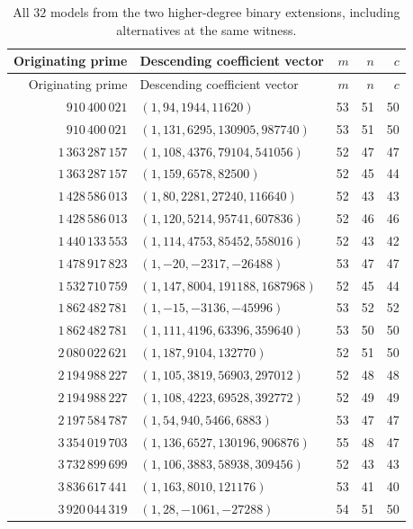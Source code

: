 \documentclass[11pt]{article}
\theoremstyle{definition}\newtheorem{definition}[theorem]{Definition}
\begin{document}
\begin{center}\small\setlength{\tabcolsep}{4pt}
\begin{longtable}{rP{85mm}rrr}
\caption{All $32$ models from the two higher-degree binary extensions, including alternatives at the same witness.}\label{tab:additional}\\
\toprule
Originating prime & Descending coefficient vector & $m$ & $n$ & $c$ \\
\midrule\endfirsthead
\toprule
Originating prime & Descending coefficient vector & $m$ & $n$ & $c$ \\
\midrule\endhead
$910\,400\,021$ & $(1,94,1944,11620)$ & 53 & 51 & 50 \\
$910\,400\,021$ & $(1,131,6295,130905,987740)$ & 53 & 51 & 50 \\
$1\,363\,287\,157$ & $(1,108,4376,79104,541056)$ & 52 & 47 & 47 \\
$1\,363\,287\,157$ & $(1,159,6578,82500)$ & 52 & 45 & 44 \\
$1\,428\,586\,013$ & $(1,80,2281,27240,116640)$ & 52 & 43 & 43 \\
$1\,428\,586\,013$ & $(1,120,5214,95741,607836)$ & 52 & 46 & 46 \\
$1\,440\,133\,553$ & $(1,114,4753,85452,558016)$ & 52 & 43 & 42 \\
$1\,478\,917\,823$ & $(1,-20,-2317,-26488)$ & 53 & 47 & 47 \\
$1\,532\,710\,759$ & $(1,147,8004,191188,1687968)$ & 52 & 45 & 44 \\
$1\,862\,482\,781$ & $(1,-15,-3136,-45996)$ & 53 & 52 & 52 \\
$1\,862\,482\,781$ & $(1,111,4196,63396,359640)$ & 53 & 50 & 50 \\
$2\,080\,022\,621$ & $(1,187,9104,132770)$ & 52 & 51 & 50 \\
$2\,194\,988\,227$ & $(1,105,3819,56903,297012)$ & 52 & 48 & 48 \\
$2\,194\,988\,227$ & $(1,108,4223,69528,392772)$ & 52 & 49 & 49 \\
$2\,197\,584\,787$ & $(1,54,940,5466,6883)$ & 53 & 47 & 47 \\
$3\,354\,019\,703$ & $(1,136,6527,130196,906876)$ & 55 & 48 & 47 \\
$3\,732\,899\,699$ & $(1,106,3883,58938,309456)$ & 52 & 43 & 43 \\
$3\,836\,617\,441$ & $(1,163,8010,121176)$ & 53 & 41 & 40 \\
$3\,920\,044\,319$ & $(1,28,-1061,-27288)$ & 54 & 51 & 50 \\

\end{longtable}
\end{center}
\end{document}
